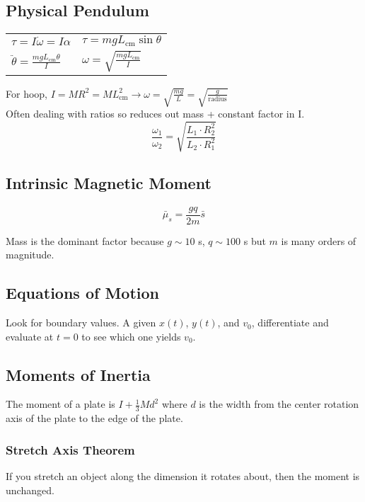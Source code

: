 \documentclass[10pt,a4paper]{article}
\begin{document}
\subsection{Physical Pendulum}
\begin{tabular}{l l}
$\tau = I \dot{\omega} = I \alpha$ & $\tau = mgL_{\textrm{cm}}\sin\theta$\\
$\ddot{\theta} = \frac{mgL_{\textrm{cm}}\theta}{I}$ & $\omega = \sqrt{\frac{mgL_{\textrm{cm}}}{I}}$
\end{tabular}

For hoop, $I=MR^2 = ML^2_{\textrm{cm}} \rightarrow \omega = \sqrt{\frac{mg}{L}} = \sqrt{\frac{g}{\textrm{radius}}}$\\
Often dealing with ratios so reduces out mass + constant factor in I.
\begin{equation}
 \frac{\omega_1}{\omega_2} = \sqrt{\frac{L_1 \cdot R^2_2}{L_2 \cdot R^2_1}}
\end{equation}

\subsection{Intrinsic Magnetic Moment}
\begin{equation}
 \bar{\mu}_s = \frac{gq}{2m}\bar{s} 
\end{equation}

Mass is the dominant factor because $g \sim 10$ s, $q \sim 100 $ s but $m$ is many orders of magnitude.

\subsection{Equations of Motion}
Look for boundary values. A given $x(t)$, $y(t)$, and $v_0$, differentiate and evaluate at $t=0$ to see which one yields $v_0$.

\subsection{Moments of Inertia}
The moment of a plate is $I+\frac{1}{3}Md^2$ where $d$ is the width from the center rotation axis of the plate to the edge of the plate. 

\subsubsection{Stretch Axis Theorem}
If you stretch an object along the dimension it rotates about, then the moment is unchanged.
\end{document}

